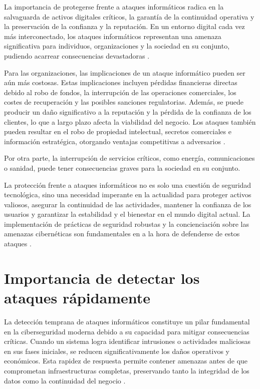La importancia de protegerse frente a ataques informáticos radica en la salvaguarda de activos digitales críticos, la garantía de la continuidad operativa y la preservación de la confianza y la reputación. En un entorno digital cada vez más interconectado, los ataques informáticos representan una amenaza significativa para individuos, organizaciones y la sociedad en su conjunto, pudiendo acarrear consecuencias devastadoras \cite{Santos2020}.

Para las organizaciones, las implicaciones de un ataque informático pueden ser aún más costosas. Estas implicaciones incluyen pérdidas financieras directas debido al robo de fondos, la interrupción de las operaciones comerciales, los costes de recuperación y las posibles sanciones regulatorias. Además, se puede producir un daño significativo a la reputación y la pérdida de la confianza de los clientes, lo que a largo plazo afecta la viabilidad del negocio. Los ataques también pueden resultar en el robo de propiedad intelectual, secretos comerciales e información estratégica, otorgando ventajas competitivas a adversarios \cite{Ponemon2019}. 

Por otra parte, la interrupción de servicios críticos, como energía, comunicaciones o sanidad, puede tener consecuencias graves para la sociedad en su conjunto.

La protección frente a ataques informáticos no es solo una cuestión de seguridad tecnológica, sino una necesidad imperante en la actualidad para proteger activos valiosos, asegurar la continuidad de las actividades, mantener la confianza de los usuarios y garantizar la estabilidad y el bienestar en el mundo digital actual. La implementación de prácticas de seguridad robustas y la concienciación sobre las amenazas cibernéticas son fundamentales en a la hora de defenderse de estos ataques \cite{Bada2017}.


\section{Importancia de detectar los ataques rápidamente}

La detección temprana de ataques informáticos constituye un pilar fundamental en la ciberseguridad moderna debido a su capacidad para mitigar consecuencias críticas. Cuando un sistema logra identificar intrusiones o actividades maliciosas en sus fases iniciales, se reducen significativamente los daños operativos y económicos. Esta rapidez de respuesta permite contener amenazas antes de que comprometan infraestructuras completas, preservando tanto la integridad de los datos como la continuidad del negocio \cite{anderson2020}.

